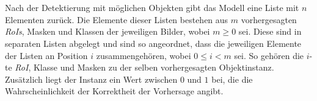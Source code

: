 \\\\
Nach der Detektierung mit möglichen Objekten gibt das Modell eine Liste mit $n$ Elementen zurück. Die Elemente dieser Listen bestehen aus $m$ vorhergesagten \textit{RoIs}, Masken und Klassen der jeweiligen Bilder, wobei $m \ge 0$ sei. Diese sind in separaten Listen abgelegt und sind so angeordnet, dass die jeweiligen Elemente der Listen an Position $i$ zusammengehören, wobei $0\le i < m$ sei. So gehören die $i$-te \textit{RoI}, Klasse und Masken zu der selben vorhergesagten Objektinstanz. Zusätzlich liegt der Instanz ein Wert zwischen $0$ und $1$ bei, die die Wahrscheinlichkeit der Korrektheit der Vorhersage angibt. 